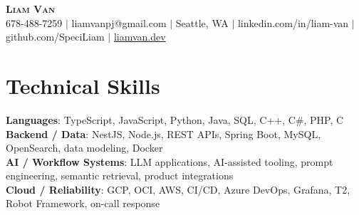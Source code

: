 \documentclass[letterpaper,11pt]{article}
\begin{document}

%
\begin{center}
    \textbf{\Huge \scshape Liam Van} \\ \vspace{1pt}
    \small 678-488-7259 $|$ \small {liamvanpj@gmail.com} $|$ Seattle, WA
 {{$|$ linkedin.com/in/liam-van} {$|$ github.com/SpeciLiam} {$|$ \href{https://liamvan.dev}{liamvan.dev}}}

\end{center}

\section{Technical Skills}
 \begin{itemize}[leftmargin=0.15in, label={}]
    \small{\item{
     \textbf{Languages}{: TypeScript, JavaScript, Python, Java, SQL, C++, C\#, PHP, C} \\
     \textbf{Backend / Data}{: NestJS, Node.js, REST APIs, Spring Boot, MySQL, OpenSearch, data modeling, Docker} \\
     \textbf{AI / Workflow Systems}{: LLM applications, AI-assisted tooling, prompt engineering, semantic retrieval, product integrations} \\
     \textbf{Cloud / Reliability}{: GCP, OCI, AWS, CI/CD, Azure DevOps, Grafana, T2, Robot Framework, on-call response} \\
    }}
 \end{itemize}
%

\end{document}
